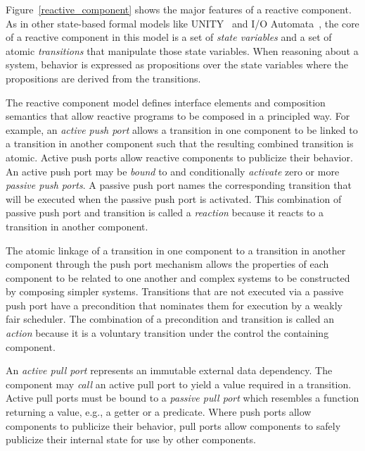 Figure~\ref{reactive_component} shows the major features of a reactive component.
As in other state-based formal models like UNITY~\cite{chandy1989parallel} and I/O Automata~\cite{nancy1996distributed}, the core of a reactive component in this model is a set of \emph{state variables} and a set of atomic \emph{transitions} that manipulate those state variables.
When reasoning about a system, behavior is expressed as propositions over the state variables where the propositions are derived from the transitions.


The reactive component model defines interface elements and composition semantics that allow reactive programs to be composed in a principled way.
For example, an \emph{active push port} allows a transition in one component to be linked to a transition in another component such that the resulting combined transition is atomic.
Active push ports allow reactive components to publicize their behavior.
An active push port may be \emph{bound} to and conditionally \emph{activate} zero or more \emph{passive push ports}.
A passive push port names the corresponding transition that will be executed when the passive push port is activated.
This combination of passive push port and transition is called a \emph{reaction} because it reacts to a transition in another component.

The atomic linkage of a transition in one component to a transition in another component through the push port mechanism allows the properties of each component to be related to one another and complex systems to be constructed by composing simpler systems.
Transitions that are not executed via a passive push port have a precondition that nominates them for execution by a weakly fair scheduler.
The combination of a precondition and transition is called an \emph{action} because it is a voluntary transition under the control the containing component.

An \emph{active pull port} represents an immutable external data dependency.
The component may \emph{call} an active pull port to yield a value required in a transition.
Active pull ports must be bound to a \emph{passive pull port} which resembles a function returning a value, e.g., a getter or a predicate.
Where push ports allow components to publicize their behavior, pull ports allow components to safely publicize their internal state for use by other components.

